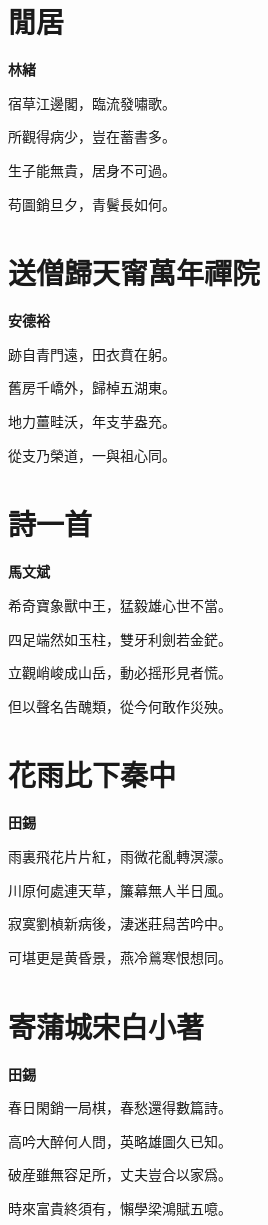 \documentclass[12pt,a4paper]{ctexbook}
\begin{document}
\section{閒居}
\textbf{林緒}\par\vspace{0.5em}
宿草江邊閣，臨流發嘯歌。\par
所觀得病少，豈在蓄書多。\par
生子能無貴，居身不可過。\par
苟圖銷旦夕，青鬢長如何。\par

\section{送僧歸天甯萬年禪院}
\textbf{安德裕}\par\vspace{0.5em}
跡自青門遠，田衣賁在躬。\par
舊房千嶠外，歸棹五湖東。\par
地力薑畦沃，年支芋盎充。\par
從支乃榮道，一與祖心同。\par

\section{詩一首}
\textbf{馬文斌}\par\vspace{0.5em}
希奇寶象獸中王，猛毅雄心世不當。\par
四足端然如玉柱，雙牙利劍若金鋩。\par
立觀峭峻成山岳，動必摇形見者慌。\par
但以聲名告醜類，從今何敢作災殃。\par

\section{花雨比下秦中}
\textbf{田錫}\par\vspace{0.5em}
雨裏飛花片片紅，雨微花亂轉溟濛。\par
川原何處連天草，簾幕無人半日風。\par
寂寞劉楨新病後，淒迷莊舄苦吟中。\par
可堪更是黄昏景，燕冷鶑寒恨想同。\par

\section{寄蒲城宋白小著}
\textbf{田錫}\par\vspace{0.5em}
春日閑銷一局棋，春愁還得數篇詩。\par
高吟大醉何人問，英略雄圖久已知。\par
破産雖無容足所，丈夫豈合以家爲。\par
時來富貴終須有，懶學梁鴻賦五噫。\par
\end{document}
